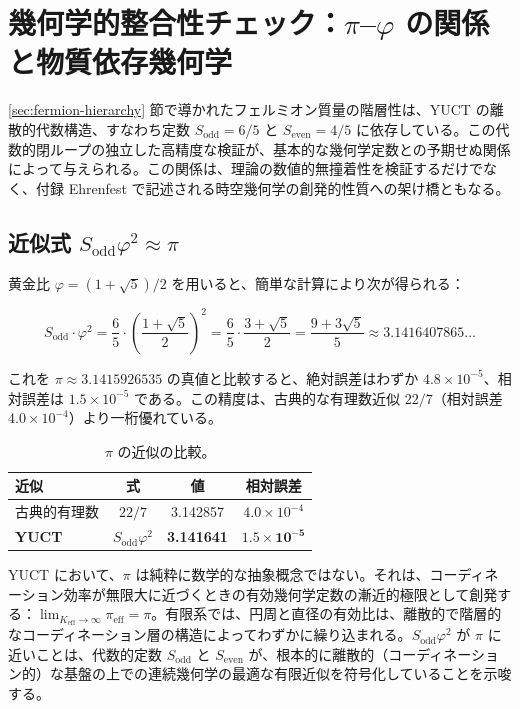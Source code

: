 \documentclass[11pt,a4paper]{article}
\theoremstyle{remark}
\begin{document}
	\section{幾何学的整合性チェック：\(\pi\)–\(\varphi\) の関係と物質依存幾何学}
	\label{sec:pi-phi-consistency}
	
	\ref{sec:fermion-hierarchy} 節で導かれたフェルミオン質量の階層性は、YUCT の離散的代数構造、すなわち定数 \(S_{\mathrm{odd}} = 6/5\) と \(S_{\mathrm{even}} = 4/5\) に依存している。この代数的閉ループの独立した高精度な検証が、基本的な幾何学定数との予期せぬ関係によって与えられる。この関係は、理論の数値的無撞着性を検証するだけでなく、付録 Ehrenfest で記述される時空幾何学の創発的性質への架け橋ともなる。
	
	\subsection{近似式 \(S_{\mathrm{odd}} \varphi^2 \approx \pi\)}
	
	黄金比 \(\varphi = (1+\sqrt{5})/2\) を用いると、簡単な計算により次が得られる：
	
	\begin{equation}
		S_{\mathrm{odd}} \cdot \varphi^2 = \frac{6}{5} \cdot \left(\frac{1+\sqrt{5}}{2}\right)^2 
		= \frac{6}{5} \cdot \frac{3+\sqrt{5}}{2} 
		= \frac{9 + 3\sqrt{5}}{5} \approx 3.1416407865\dots
	\end{equation}
	
	これを \(\pi \approx 3.1415926535\) の真値と比較すると、絶対誤差はわずか \(4.8 \times 10^{-5}\)、相対誤差は \(1.5 \times 10^{-5}\) である。この精度は、古典的な有理数近似 \(22/7\)（相対誤差 \(4.0 \times 10^{-4}\)）より一桁優れている。
	
	\begin{table}[htbp]
		\centering
		\caption{\(\pi\) の近似の比較。}
		\label{tab:pi_approx}
		\begin{tabular}{lccc}
			\toprule
			\textbf{近似} & \textbf{式} & \textbf{値} & \textbf{相対誤差} \\
			\midrule
			古典的有理数 & \(22/7\) & 3.142857 & \(4.0 \times 10^{-4}\) \\
			\textbf{YUCT} & \(S_{\mathrm{odd}}\varphi^2\) & \textbf{3.141641} & \(\mathbf{1.5 \times 10^{-5}}\) \\
			\bottomrule
		\end{tabular}
	\end{table}
	
	YUCT において、\(\pi\) は純粋に数学的な抽象概念ではない。それは、コーディネーション効率が無限大に近づくときの有効幾何学定数の漸近的極限として創発する：\(\lim_{K_{\mathrm{eff}} \to \infty} \pi_{\mathrm{eff}} = \pi\)。有限系では、円周と直径の有効比は、離散的で階層的なコーディネーション層の構造によってわずかに繰り込まれる。\(S_{\mathrm{odd}}\varphi^2\) が \(\pi\) に近いことは、代数的定数 \(S_{\mathrm{odd}}\) と \(S_{\mathrm{even}}\) が、根本的に離散的（コーディネーション的）な基盤の上での連続幾何学の最適な有限近似を符号化していることを示唆する。
	
\end{document}

